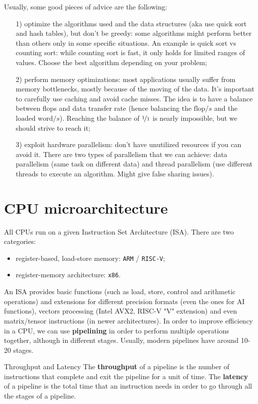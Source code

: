 Usually, some good pieces of advice are the following:
\begin{itemize}
    \item [1)] optimize the algorithms used and the data structures (aka use quick sort and hash tables), but don't be greedy: some algorithms might perform better than others only in some specific situations. An example is quick sort vs counting sort: while counting sort is fast, it only holds for limited ranges of values. Choose the best algorithm depending on your problem;
    \item [2)] perform memory optimizations: most applications usually suffer from memory bottlenecks, mostly because of the moving of the data. It's important to carefully use caching and avoid cache misses. The idea is to have a balance between flops and data transfer rate (hence balancing the $\text{flop}/s$ and the $\text{loaded word}/s$). Reaching the balance of $\nicefrac{1}{1}$ is nearly impossible, but we should strive to reach it;
    \item [3)] exploit hardware parallelism: don't have unutilized resources if you can avoid it. There are two types of parallelism that we can achieve: data parallelism (same task on different data) and thread parallelism (use different threads to execute an algorithm. Might give false sharing issues).
\end{itemize}

\section{CPU microarchitecture}

All CPUs run on a given Instruction Set Architecture (ISA). There are two categories:
\begin{itemize}
    \item register-based, load-store memory: \verb|ARM| / \verb|RISC-V|;
    \item register-memory architecture: \verb|x86|.
\end{itemize}

An ISA provides basic functions (such as load, store, control and arithmetic operations) and extensions for different precision formats (even the ones for AI functions), vectors processing (Intel AVX2, RISC-V "V" extension) and even matrix/tensor instructions (in newer architectures).
\nwl
In order to improve efficiency in a CPU, we can use \textbf{pipelining} in order to perform multiple operations together, although in different stages. Usually, modern pipelines have around 10-20 stages.
\nwl
\begin{definition}{Throughput and Latency}
    The \textbf{throughput} of a pipeline is the number of instructions that complete and exit the pipeline for a unit of time.
    \nwl
    The \textbf{latency} of a pipeline is the total time that an instruction needs in order to go through all the stages of a pipeline.
\end{definition}

